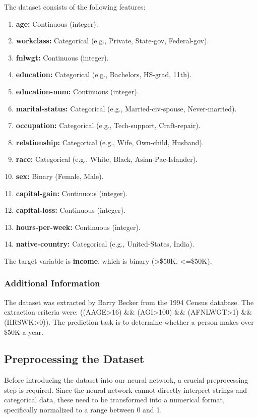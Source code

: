 \documentclass{article}
\begin{document}
The dataset consists of the following features:
\begin{enumerate}
    \item \textbf{age:} Continuous (integer).
    \item \textbf{workclass:} Categorical (e.g., Private, State-gov, Federal-gov).
    \item \textbf{fnlwgt:} Continuous (integer).
    \item \textbf{education:} Categorical (e.g., Bachelors, HS-grad, 11th).
    \item \textbf{education-num:} Continuous (integer).
    \item \textbf{marital-status:} Categorical (e.g., Married-civ-spouse, Never-married).
    \item \textbf{occupation:} Categorical (e.g., Tech-support, Craft-repair).
    \item \textbf{relationship:} Categorical (e.g., Wife, Own-child, Husband).
    \item \textbf{race:} Categorical (e.g., White, Black, Asian-Pac-Islander).
    \item \textbf{sex:} Binary (Female, Male).
    \item \textbf{capital-gain:} Continuous (integer).
    \item \textbf{capital-loss:} Continuous (integer).
    \item \textbf{hours-per-week:} Continuous (integer).
    \item \textbf{native-country:} Categorical (e.g., United-States, India).
\end{enumerate}
The target variable is \textbf{income}, which is binary (>\$50K, <=\$50K).

\subsubsection{Additional Information}

The dataset was extracted by Barry Becker from the 1994 Census database. The extraction criteria were: ((AAGE>16) \&\& (AGI>100) \&\& (AFNLWGT>1) \&\& (HRSWK>0)). The prediction task is to determine whether a person makes over \$50K a year.

\subsection{Preprocessing the Dataset}

Before introducing the dataset into our neural network, a crucial preprocessing step is required. Since the neural network cannot directly interpret strings and categorical data, these need to be transformed into a numerical format, specifically normalized to a range between 0 and 1.
\end{document}
